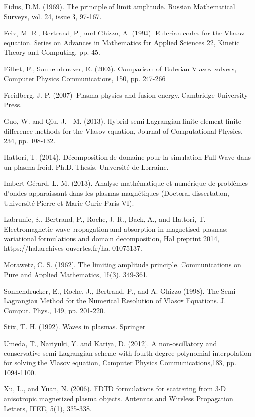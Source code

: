 \documentclass[proc]{edpsmath}
\begin{document}
\begin{thebibliography}{99}
 Eidus, D.M. (1969). The principle of limit amplitude. Russian Mathematical Surveys, vol. 24, issue 3, 97-167.

 Feix, M. R., Bertrand, P., and Ghizzo, A.  (1994). Eulerian codes for the Vlasov equation.  Series on Advances
in Mathematics for Applied Sciences 22, Kinetic Theory and Computing, pp. 45.


 Filbet, F., Sonnendrucker, E.  (2003). 
 Comparison of Eulerian Vlasov solvers,
Computer Physics Communications,
150, pp. 247-266

 Freidberg, J. P. (2007). Plasma physics and fusion energy. Cambridge University Press.

Guo, W. and Qiu, J. - M. (2013). 
Hybrid semi-Lagrangian finite element-finite difference methods for the Vlasov
equation,
Journal of Computational Physics,
234, pp. 108-132.

Hattori, T. (2014).
D\'ecomposition de domaine pour la simulation Full-Wave dans un plasma froid.
Ph.D. Thesis, Universit\'e de
Lorraine.

 Imbert-Gérard, L. M. (2013). Analyse mathématique et numérique de problèmes d'ondes apparaissant dans les plasmas magnétiques (Doctoral dissertation, Université Pierre et Marie Curie-Paris VI).




Labrunie, S., Bertrand, P., Roche, J.-R., Back, A., and
Hattori, T. 
Electromagnetic wave propagation and absorption in
magnetised plasmas: variational formulations and
domain decomposition, Hal preprint 2014, https://hal.archives-ouvertes.fr/hal-01075137.




 Morawetz, C. S. (1962). The limiting amplitude principle. Communications on Pure and Applied Mathematics, 15(3), 349-361.



Sonnendrucker, E., Roche, J., Bertrand, P., and A. Ghizzo (1998). 
The Semi-Lagrangian Method for the
Numerical Resolution of Vlasov Equations.
J. Comput. Phys.,
149, pp. 201-220.

 Stix, T. H. (1992). Waves in plasmas. Springer.



Umeda, T., Nariyuki, Y. and Kariya, D. (2012).
A non-oscillatory and conservative semi-Lagrangian scheme with
fourth-degree polynomial interpolation for solving the Vlasov equation,
Computer Physics Communications,183, pp. 1094-1100.

Xu, L., and Yuan, N. (2006). FDTD formulations for scattering from 3-D anisotropic magnetized plasma objects. Antennas and Wireless Propagation Letters, IEEE, 5(1), 335-338.




\end{thebibliography}
\end{document}
